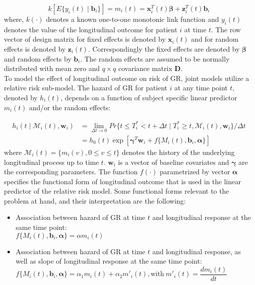 \begin{equation*}
k[E\{y_i(t) \mid \boldsymbol{b}_i\}] = m_i(t) = \boldsymbol{x}_i^T(t) \boldsymbol{\beta} + \boldsymbol{z}_i^T(t) \boldsymbol{b}_i
\end{equation*}
where, $k(\cdot)$ denotes a known one-to-one monotonic link function and $y_i(t)$ denotes the value of the longitudinal outcome for patient $i$ at time $t$. The row vector of design matrix for fixed effects is denoted by $\boldsymbol{x}_i(t)$ and for random effects is denoted by $\boldsymbol{z}_i(t)$. Correspondingly the fixed effects are denoted by $\boldsymbol{\beta}$ and random effects by $\boldsymbol{b}_i$. The random effects are assumed to be normally distributed with mean zero and $q \times q$ covariance matrix $\boldsymbol{D}$.\\

To model the effect of longitudinal outcome on risk of GR, joint models utilize a relative risk sub-model. The hazard of GR for patient $i$ at any time point $t$, denoted by $h_i(t)$, depends on a function of subject specific linear predictor $m_i(t)$ and/or the random effects:

\begin{align*}
h_i(t \mid \mathcal{M}_i(t), \boldsymbol{w}_i) &= \lim_{\Delta t \to 0} Pr\{t \leq T^*_i < t + \Delta t \mid T^*_i \geq t, \mathcal{M}_i(t), \boldsymbol{w}_i\}/\Delta t\\
&=h_0(t) \exp[\boldsymbol{\gamma}^T\boldsymbol{w}_i + f\{M_i(t), \boldsymbol{b}_i, \boldsymbol{\alpha}\}]
\end{align*}
where $\mathcal{M}_i(t) = \{m_i(v), 0\leq v \leq t\}$ denotes the history of the underlying longitudinal process up to time $t$. $\boldsymbol{w}_i$ is a vector of baseline covariates and $\boldsymbol{\gamma}$ are the corresponding parameters. The function $f(\cdot)$ parametrized by vector $\boldsymbol{\alpha}$ specifies the functional form \citep{brown2009assessing,rizopoulos2012joint,taylor2013real} of longitudinal outcome that is used in the linear predictor of the relative risk model. Some functional forms relevant to the problem at hand, and their interpretation are the following: 

\begin{itemize}
\item Association between hazard of GR at time $t$ and longitudinal response at the same time point:\\
$f\{M_i(t), \boldsymbol{b}_i, \boldsymbol{\alpha}\} = \alpha m_i(t)$
\item Association between hazard of GR at time $t$ and longitudinal response, as well as slope of longitudinal response at the same time point:\\
$f\{M_i(t), \boldsymbol{b}_i, \boldsymbol{\alpha}\} = \alpha_1 m_i(t) + \alpha_2 m'_i(t), \text{with}\  m'_i(t) = \dfrac{d m_i(t)}{dt}$
\end{itemize}

